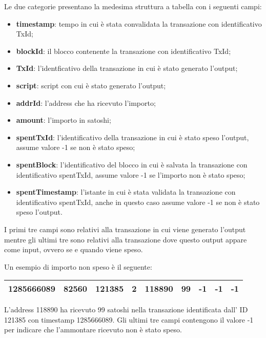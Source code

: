 Le due categorie presentano la medesima struttura a tabella con i seguenti campi:
\begin{itemize}
    \item \textbf{timestamp}: tempo in cui è stata convalidata la transazione con identificativo TxId;  
    \item \textbf{blockId}: il blocco contenente la transazione con identificativo TxId;   
    \item \textbf{TxId}: l'identficativo della transazione in cui è stato generato l'output;
    \item \textbf{script}: script con cui è stato generato l'output;
    \item \textbf{addrId}: l'address che ha ricevuto l'importo;
    \item \textbf{amount}: l'importo in satoshi;
    \item \textbf{spentTxId}: l'identificativo della transazione in cui è stato speso l'output, assume valore -1 se non è stato speso;
    \item \textbf{spentBlock}: l'identificativo del blocco in cui è salvata la transazione con identificativo spentTxId, assume valore -1 se l'importo non è stato speso;
    \item \textbf{spentTimestamp}: l'istante in cui è stata validata la transazione con identificativo spentTxId, anche in questo caso assume valore -1 se non è stato speso l'output.
\end{itemize}

I primi tre campi sono relativi alla transazione in cui viene generato l'output mentre gli ultimi tre sono relativi alla transazione dove questo output appare come input, ovvero se e quando viene speso.

Un esempio di importo non speso è il seguente:
\begin{table}[h]
\centering
\begin{tabular}{|r|r|r|r|r|r|r|r|r|}
\toprule
1285666089 &    82560 & 121385 &  2 &      118890 &       99 &         -1 &          -1 &              -1 \\
\bottomrule
\end{tabular}
\end{table}
\FloatBarrier
L'address 118890 ha ricevuto 99 satoshi nella transazione identificata dall' ID 121385 con timestamp 1285666089. Gli ultimi tre campi contengono il valore -1 per indicare che l'ammontare ricevuto non è stato speso.


